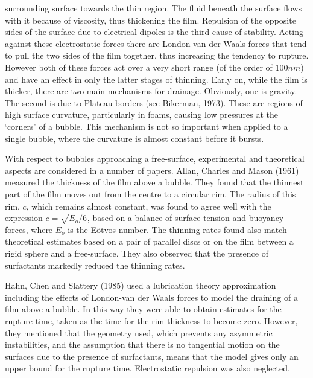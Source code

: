 surrounding surface towards the thin region. The fluid beneath the surface
flows with it because of viscosity, thus thickening the film.
Repulsion of the opposite sides of the surface 
due to electrical dipoles is the third cause of stability.
Acting against these electrostatic forces there are 
London-van der Waals forces that tend to pull the two sides of the
film together, thus increasing the tendency to rupture. However
both of these forces act over a very short range (of the
order of $100nm$) and
have an effect in only the latter stages of thinning.
Early on, while the film is thicker,
there are two main mechanisms for drainage.
Obviously, one is gravity.
The second is due to Plateau borders 
(see Bikerman, 1973). These are 
regions of high surface curvature, 
particularly in foams, causing low pressures at the `corners' of a bubble. 
This mechanism is not so important when applied to a single 
bubble, where the curvature is almost
constant before it bursts.

With respect to bubbles approaching a free-surface, 
experimental and theoretical aspects are considered
in a number of papers.
Allan, Charles and Mason (1961) measured the thickness of the film
above a bubble. They found that the thinnest part of the film
moves out from the centre to a circular rim.
The radius of this rim, $c$, which remains almost constant, 
was found to agree well with the expression 
$c=\sqrt{E_o/6}$, based on a balance of surface tension and buoyancy
forces, where $E_o$ is the E\"otvos number.
The thinning rates found also match theoretical
estimates based on a pair of parallel discs or on the 
film between a rigid sphere and a free-surface. They also observed 
that the presence of
surfactants markedly reduced the thinning rates.

Hahn, Chen and Slattery (1985) used a lubrication theory approximation
including the effects of London-van der Waals forces
to model the draining of a film above a bubble. 
In this way they were able to obtain
estimates for the rupture time, taken as the time for the rim 
thickness to become zero. 
However, they mentioned that the geometry used, which
prevents any asymmetric instabilities, and the assumption that there
is no tangential motion on the surfaces due to the presence of
surfactants, means that the model gives only an upper bound for 
the rupture time. Electrostatic
repulsion was also neglected.

